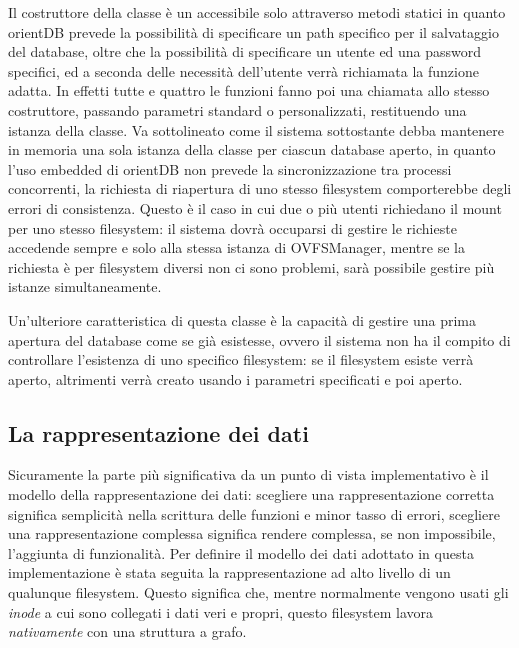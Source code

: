 Il costruttore della classe è un accessibile solo attraverso metodi statici in quanto orientDB prevede la possibilità di specificare un path specifico per il salvataggio del database, oltre che la possibilità di specificare un utente ed una password specifici, ed a seconda delle necessità dell'utente verrà richiamata la funzione adatta. In effetti tutte e quattro le funzioni fanno poi una chiamata allo stesso costruttore, passando parametri standard o personalizzati, restituendo una istanza della classe. Va sottolineato come il sistema sottostante debba mantenere in memoria una sola istanza della classe per ciascun database aperto, in quanto l'uso embedded di orientDB non prevede la sincronizzazione tra processi concorrenti, la richiesta di riapertura di uno stesso filesystem comporterebbe degli errori di consistenza. Questo è il caso in cui due o più utenti richiedano il mount per uno stesso filesystem: il sistema dovrà occuparsi di gestire le richieste accedende sempre e solo alla stessa istanza di OVFSManager, mentre se la richiesta è per filesystem diversi non ci sono problemi, sarà possibile gestire più istanze simultaneamente.

Un'ulteriore caratteristica di questa classe è la capacità di gestire una prima apertura del database come se già esistesse, ovvero il sistema non ha il compito di controllare l'esistenza di uno specifico filesystem: se il filesystem esiste verrà aperto, altrimenti verrà creato usando i parametri specificati e poi aperto.

\subsection {La rappresentazione dei dati}
Sicuramente la parte più significativa da un punto di vista implementativo è il modello della rappresentazione dei dati: scegliere una rappresentazione corretta significa semplicità nella scrittura delle funzioni e minor tasso di errori, scegliere una rappresentazione complessa significa rendere complessa, se non impossibile, l'aggiunta di funzionalità.
Per definire il modello dei dati adottato in questa implementazione è stata seguita la rappresentazione ad alto livello di un qualunque filesystem. Questo significa che, mentre normalmente vengono usati gli \emph{inode} a cui sono collegati i dati veri e propri, questo filesystem lavora \emph{nativamente} con una struttura a grafo.

